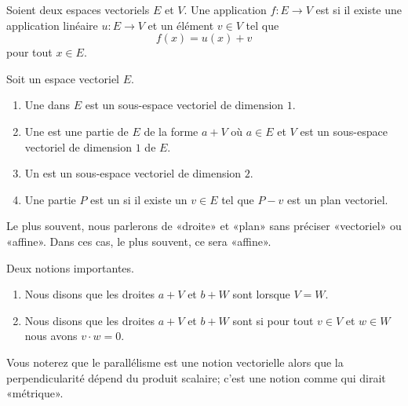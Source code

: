 \begin{definition}      \label{DEFooVTXWooVXfUnc}
    Soient deux espaces vectoriels \( E\) et \( V\). Une application \( f\colon E\to V\) est  si il existe une application linéaire \( u\colon E \to V\) et un élément \( v\in V\) tel que
    \begin{equation}
        f(x)=u(x)+v
    \end{equation}
    pour tout \( x\in E\).
\end{definition}

\begin{definition}      \label{DEFooTQIFooKcloeY}
    Soit un espace vectoriel \( E\). 
    \begin{enumerate}
        \item
        Une  dans \( E\) est un sous-espace vectoriel de dimension \( 1\). 
    \item
        Une  est une partie de \( E\) de la forme \( a+V\) où \( a\in E\) et \( V\) est un sous-espace vectoriel de dimension \( 1\) de \( E\).
    \item
        Un  est un sous-espace vectoriel de dimension \( 2\).
    \item
        Une partie \( P\) est un  si il existe un \( v\in E\) tel que \( P-v\) est un plan vectoriel.
    \end{enumerate}
    Le plus souvent, nous parlerons de «droite» et «plan» sans préciser «vectoriel» ou «affine». Dans ces cas, le plus souvent, ce sera «affine».
\end{definition}

\begin{definition}
    Deux notions importantes.
    \begin{enumerate}
        \item
            Nous disons que les droites \( a+V\) et \( b+W\) sont  lorsque \( V=W\).
        \item
            Nous disons que les droites \( a+V\) et \( b+W\) sont  si pour tout \( v\in V\) et \( w\in W\) nous avons \( v\cdot w=0\).
    \end{enumerate}
    Vous noterez que le parallélisme est une notion vectorielle alors que la perpendicularité dépend du produit scalaire; c'est une notion comme qui dirait «métrique».
\end{definition}

